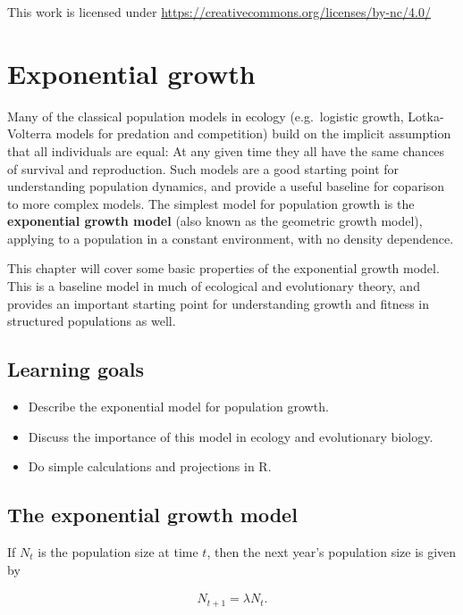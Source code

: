 \documentclass[
]{book}
\begin{document}
This work is licensed under \url{https://creativecommons.org/licenses/by-nc/4.0/}

\hypertarget{s01-Exponential}{%
\chapter{Exponential growth}\label{s01-Exponential}}

Many of the classical population models in ecology (e.g.~logistic growth, Lotka-Volterra models for predation and competition) build on the implicit assumption that all individuals are equal: At any given time they all have the same chances of survival and reproduction. Such models are a good starting point for understanding population dynamics, and provide a useful baseline for coparison to more complex models. The simplest model for population growth is the \textbf{exponential growth model} (also known as the geometric growth model), applying to a population in a constant environment, with no density dependence.

This chapter will cover some basic properties of the exponential growth model. This is a baseline model in much of ecological and evolutionary theory, and provides an important starting point for understanding growth and fitness in structured populations as well.

\hypertarget{learning-goals}{%
\section{Learning goals}\label{learning-goals}}

\begin{itemize}
\item
  Describe the exponential model for population growth.
\item
  Discuss the importance of this model in ecology and evolutionary biology.
\item
  Do simple calculations and projections in R.
\end{itemize}

\hypertarget{the-exponential-growth-model}{%
\section{The exponential growth model}\label{the-exponential-growth-model}}

If \(N_t\) is the population size at time \(t\), then the next year's population size is given by

\begin{align}
N_{t+1}=\lambda N_t.
\label{eq:exp1}
\end{align}
\end{document}
